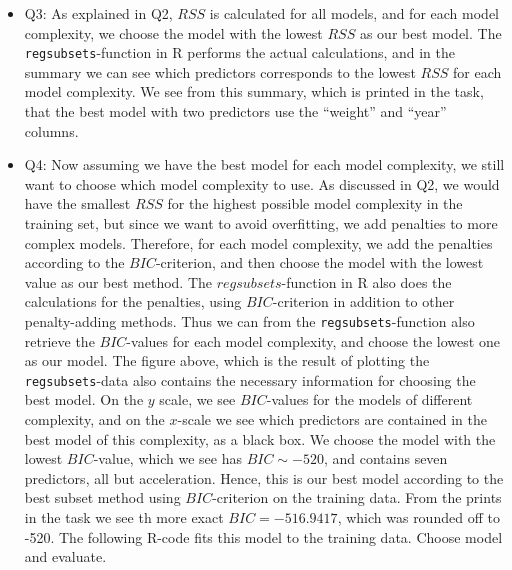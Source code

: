 \documentclass[]{article}
\newenvironment{Shaded}{\begin{snugshade}}{\end{snugshade}}
\newcommand{\KeywordTok}[1]{\textcolor[rgb]{0.13,0.29,0.53}{\textbf{#1}}}
\newcommand{\DataTypeTok}[1]{\textcolor[rgb]{0.13,0.29,0.53}{#1}}
\newcommand{\DecValTok}[1]{\textcolor[rgb]{0.00,0.00,0.81}{#1}}
\newcommand{\OperatorTok}[1]{\textcolor[rgb]{0.81,0.36,0.00}{\textbf{#1}}}
\newcommand{\NormalTok}[1]{#1}
\providecommand{\tightlist}{%
  \setlength{\itemsep}{0pt}\setlength{\parskip}{0pt}}
\begin{document}
\begin{itemize}
\tightlist
\item
  Q3: As explained in Q2, \(RSS\) is calculated for all models, and for
  each model complexity, we choose the model with the lowest \(RSS\) as
  our best model. The \texttt{regsubsets}-function in R performs the
  actual calculations, and in the summary we can see which predictors
  corresponds to the lowest \(RSS\) for each model complexity. We see
  from this summary, which is printed in the task, that the best model
  with two predictors use the ``weight'' and ``year'' columns.
\item
  Q4: Now assuming we have the best model for each model complexity, we
  still want to choose which model complexity to use. As discussed in
  Q2, we would have the smallest \(RSS\) for the highest possible model
  complexity in the training set, but since we want to avoid
  overfitting, we add penalties to more complex models. Therefore, for
  each model complexity, we add the penalties according to the
  \(BIC\)-criterion, and then choose the model with the lowest value as
  our best method. The \(regsubsets\)-function in R also does the
  calculations for the penalties, using \(BIC\)-criterion in addition to
  other penalty-adding methods. Thus we can from the
  \texttt{regsubsets}-function also retrieve the \(BIC\)-values for each
  model complexity, and choose the lowest one as our model. The figure
  above, which is the result of plotting the \texttt{regsubsets}-data
  also contains the necessary information for choosing the best model.
  On the \(y\) scale, we see \(BIC\)-values for the models of different
  complexity, and on the \(x\)-scale we see which predictors are
  contained in the best model of this complexity, as a black box. We
  choose the model with the lowest \(BIC\)-value, which we see has
  \(BIC\sim -520\), and contains seven predictors, all but acceleration.
  Hence, this is our best model according to the best subset method
  using \(BIC\)-criterion on the training data. From the prints in the
  task we see th more exact \(BIC=-516.9417\), which was rounded off to
  -520. The following R-code fits this model to the training data.
  Choose model and evaluate.
\end{itemize}

\begin{Shaded}
\end{Shaded}
\end{document}
